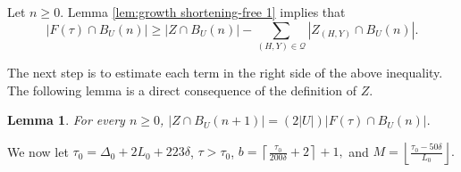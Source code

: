 \documentclass[leqno,a4paper,10pt]{amsart}
\theoremstyle{plain}
\newtheorem{lem}[thm]{Lemma}
\theoremstyle{definition}
\theoremstyle{remark}
\newcommand{\scrQ}{\mathscr{Q}}
\let\ge\geqslant
\begin{document}
Let $n\ge 0$. Lemma \ref{lem:growth shortening-free 1} implies that
\begin{equation}
	\label{eq:growth shortening-free}
	|F(\tau)\cap B_U(n)|\ge |Z\cap B_U(n)|-\sum_{(H,Y)\in\scrQ}|Z_{(H,Y)}\cap B_U(n)|.
\end{equation}

The next step is to estimate each term in the right side of the above inequality. The following lemma is a direct consequence of the definition of $Z$.

\begin{lem}
	\label{lem:growth shortening-free 2} 	For every $n\ge 0$, 
$|Z\cap B_U(n+1)|= (2|U|)|F(\tau)\cap B_U(n)|.$
\end{lem}
We now let  
$\tau_0=\Delta_0+2L_0+223\delta$, $\tau>\tau_0$,  
	$ b=\left\lceil \frac{\tau_0}{200\delta}+2\right\rceil+1,$ and $M=\left\lfloor\frac{\tau_0-50\delta}{L_0}\right\rfloor.$
\end{document}
